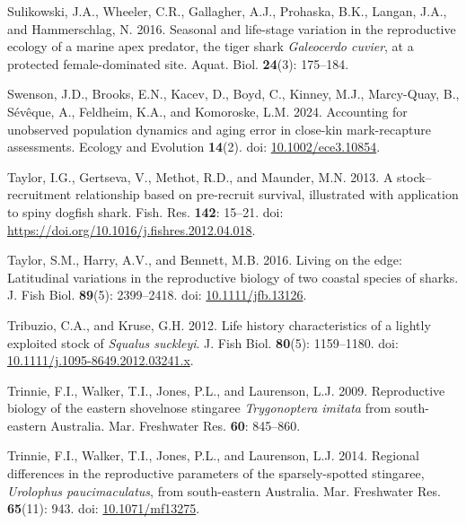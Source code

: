 \documentclass[
]{article}
\newenvironment{CSLReferences}%
  {}%
  {\par}
\begin{document}
\begin{CSLReferences}{1}{0}
Sulikowski, J.A., Wheeler, C.R., Gallagher, A.J., Prohaska, B.K., Langan, J.A., and Hammerschlag, N. 2016. Seasonal and life-stage variation in the reproductive ecology of a marine apex predator, the tiger shark \emph{{Galeocerdo} cuvier}, at a protected female-dominated site. Aquat. Biol. \textbf{24}(3): 175--184.

Swenson, J.D., Brooks, E.N., Kacev, D., Boyd, C., Kinney, M.J., Marcy-Quay, B., Sévêque, A., Feldheim, K.A., and Komoroske, L.M. 2024. Accounting for unobserved population dynamics and aging error in close{-}kin mark{-}recapture assessments. Ecology and Evolution \textbf{14}(2). doi: \href{https://doi.org/10.1002/ece3.10854}{10.1002/ece3.10854}.

Taylor, I.G., Gertseva, V., Methot, R.D., and Maunder, M.N. 2013. A stock--recruitment relationship based on pre-recruit survival, illustrated with application to spiny dogfish shark. Fish. Res. \textbf{142}: 15--21. doi: \url{https://doi.org/10.1016/j.fishres.2012.04.018}.

Taylor, S.M., Harry, A.V., and Bennett, M.B. 2016. Living on the edge: Latitudinal variations in the reproductive biology of two coastal species of sharks. J. Fish Biol. \textbf{89}(5): 2399--2418. doi: \href{https://doi.org/10.1111/jfb.13126}{10.1111/jfb.13126}.

Tribuzio, C.A., and Kruse, G.H. 2012. Life history characteristics of a lightly exploited stock of \emph{{Squalus} suckleyi}. J. Fish Biol. \textbf{80}(5): 1159--1180. doi: \href{https://doi.org/10.1111/j.1095-8649.2012.03241.x}{10.1111/j.1095-8649.2012.03241.x}.

Trinnie, F.I., Walker, T.I., Jones, P.L., and Laurenson, L.J. 2009. Reproductive biology of the eastern shovelnose stingaree \emph{{Trygonoptera} imitata} from south-eastern {Australia}. Mar. Freshwater Res. \textbf{60}: 845--860.

Trinnie, F.I., Walker, T.I., Jones, P.L., and Laurenson, L.J. 2014. Regional differences in the reproductive parameters of the sparsely-spotted stingaree, {\emph{Urolophus paucimaculatus}}, from south-eastern Australia. Mar. Freshwater Res. \textbf{65}(11): 943. doi: \href{https://doi.org/10.1071/mf13275}{10.1071/mf13275}.


\end{CSLReferences}
\end{document}
